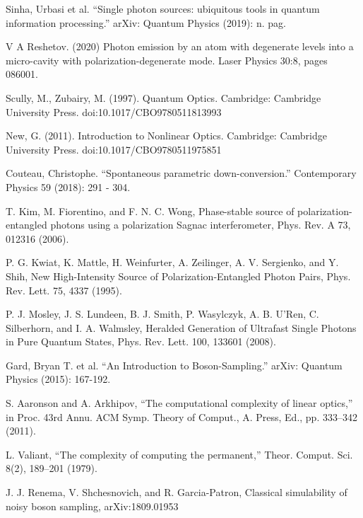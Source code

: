 \documentclass[10pt,a4paper,twocolumn]{PPRAcn} %
\begin{document}
\small
\renewcommand\refname{参考文献}

\begin{thebibliography}{99}  

 Sinha, Urbasi et al. “Single photon sources: ubiquitous tools in quantum information processing.” arXiv: Quantum Physics (2019): n. pag.

 V A Reshetov. (2020) Photon emission by an atom with degenerate levels into a micro-cavity with polarization-degenerate mode. Laser Physics 30:8, pages 086001.

Scully, M., Zubairy, M. (1997). Quantum Optics. Cambridge: Cambridge University Press. doi:10.1017/CBO9780511813993

 New, G. (2011). Introduction to Nonlinear Optics. Cambridge: Cambridge University Press. doi:10.1017/CBO9780511975851

 Couteau, Christophe. “Spontaneous parametric down-conversion.” Contemporary Physics 59 (2018): 291 - 304.

T. Kim, M. Fiorentino, and F. N. C. Wong, Phase-stable source of polarization-entangled photons using a polarization Sagnac interferometer, Phys. Rev. A 73, 012316 (2006).

P. G. Kwiat, K. Mattle, H. Weinfurter, A. Zeilinger, A. V. Sergienko, and Y. Shih, New High-Intensity Source of Polarization-Entangled Photon Pairs, Phys. Rev. Lett. 75, 4337 (1995).

P. J. Mosley, J. S. Lundeen, B. J. Smith, P. Wasylczyk, A. B. U’Ren, C. Silberhorn, and I. A. Walmsley, Heralded Generation of Ultrafast Single Photons in Pure Quantum States, Phys. Rev. Lett. 100, 133601 (2008).

 Gard, Bryan T. et al. “An Introduction to Boson-Sampling.” arXiv: Quantum Physics (2015): 167-192.

 S. Aaronson and A. Arkhipov, “The computational complexity of linear optics,” in Proc. 43rd Annu. ACM Symp. Theory of Comput., A. Press, Ed., pp. 333–342 (2011).

 L. Valiant, “The complexity of computing the permanent,” Theor. Comput. Sci. 8(2), 189–201 (1979).

 J. J. Renema, V. Shchesnovich, and R. Garcia-Patron, Classical simulability of noisy boson sampling, arXiv:1809.01953

\end{thebibliography}

\end{document}
